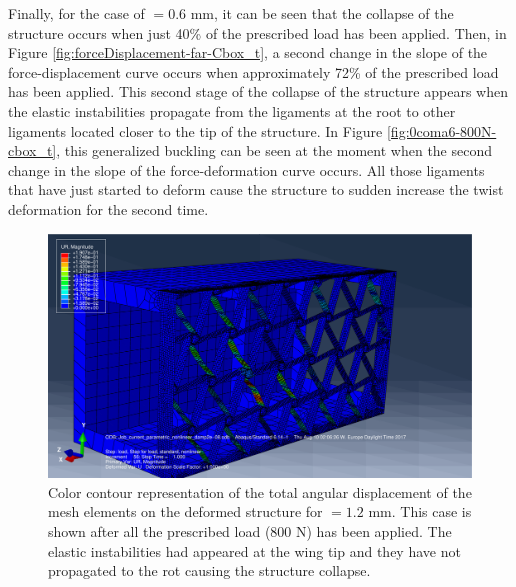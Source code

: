     Finally, for the case of \boxt$= 0.6$ mm, it can be seen that the collapse of the structure occurs when just 40\% of the prescribed load has been applied. Then, in Figure \ref{fig:forceDisplacement-far-Cbox_t}, a second change in the slope of the force-displacement curve occurs when approximately 72\% of the prescribed load has been applied. This second stage of the collapse of the structure appears when the elastic instabilities propagate from the ligaments at the root to other ligaments located closer to the tip of the structure. In Figure \ref{fig:0coma6-800N-cbox_t}, this generalized buckling can be seen at the moment when the second change in the slope of the force-deformation curve occurs. All those ligaments that have just started to deform cause the structure to sudden increase the twist deformation for the second time. 

    \begin{figure}[!htpb] %
      \centering
      \includegraphics[width=0.8 \textwidth]{figures/../figures/result-sim/cbox/1coma4-800N}
      \caption[Color contour representation of the total angular displacement of the mesh elements on the deformed structure for \boxt$ = 1.2$ mm]{Color contour representation of the total angular displacement of the mesh elements on the deformed structure for \boxt$ = 1.2$ mm. This case is shown after all the prescribed load (800 N) has been applied. The elastic instabilities had appeared at the wing tip and they have not propagated to the rot causing the structure collapse.}\label{fig:1coma2-800N-cbox_t}
    \end{figure}

